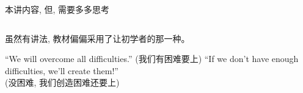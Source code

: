 
\begin{frame}{}
  \begin{columns}
      \pause
  \end{columns}
\end{frame}

\begin{frame}{}
  \begin{center}
    \begin{center}
      本讲内容, 但, 需要多多思考
    \end{center}
  \end{center}
\end{frame}

\begin{frame}{}
  \begin{columns}
  \end{columns}
  \begin{center}
    虽然有讲法, 教材偏偏采用了让初学者的那一种。
  \end{center}
\end{frame}

\begin{frame}{}
  \begin{center}
    ``We will overcome all difficulties.'' (我们有困难要上)
    ``If we don't have enough difficulties, we'll create them!'' \\
    (没困难, 我们创造困难还要上)
  \end{center}
\end{frame}

\begin{frame}{}
  \begin{center}

    \pause
    \vspace{1.00cm}
  \end{center}
\end{frame}
